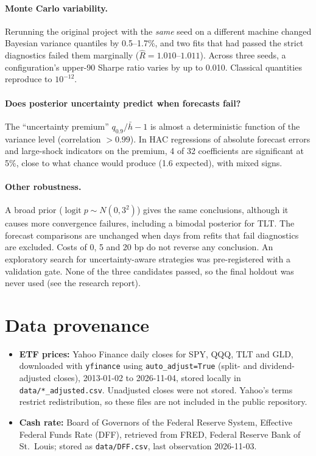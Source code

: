 \documentclass[11pt]{article}
\newcommand{\logit}{\operatorname{logit}}
\begin{document}
\paragraph{Monte Carlo variability.} Rerunning the original project with the \emph{same} seed on a different machine
changed Bayesian variance quantiles by 0.5--1.7\%, and two fits that had passed the strict diagnostics failed them
marginally ($\hat R=1.010$--$1.011$). Across three seeds, a configuration's upper-90 Sharpe ratio varies by up to 0.010.
Classical quantities reproduce to $10^{-12}$.

\paragraph{Does posterior uncertainty predict when forecasts fail?} The ``uncertainty premium'' $q_{0.9}/\bar h-1$ is
almost a deterministic function of the variance level (correlation $>0.99$). In HAC regressions of absolute forecast
errors and large-shock indicators on the premium, 4 of 32 coefficients are significant at 5\%, close to what chance
would produce (1.6 expected), with mixed signs.

\paragraph{Other robustness.} A broad prior ($\logit p\sim N(0,3^2)$) gives the same conclusions, although it causes
more convergence failures, including a bimodal posterior for TLT. The forecast comparisons are unchanged when days from
refits that fail diagnostics are excluded. Costs of 0, 5 and 20 bp do not reverse any conclusion. An exploratory search
for uncertainty-aware strategies was pre-registered with a validation gate. None of the three candidates passed, so
the final holdout was never used (see the research report).

\section{Data provenance}\label{app:data}
\begin{itemize}
\item \textbf{ETF prices:} Yahoo Finance daily closes for SPY, QQQ, TLT and GLD, downloaded with \texttt{yfinance} using \texttt{auto\_adjust=True} (split- and dividend-adjusted closes), 2013-01-02 to 2026-11-04, stored locally in \texttt{data/*\_adjusted.csv}. Unadjusted closes were not stored. Yahoo's terms restrict redistribution, so these files are not included in the public repository.
\item \textbf{Cash rate:} Board of Governors of the Federal Reserve System, Effective Federal Funds Rate (DFF), retrieved from FRED, Federal Reserve Bank of St.~Louis; stored as \texttt{data/DFF.csv}, last observation 2026-11-03.
\end{itemize}
\end{document}
